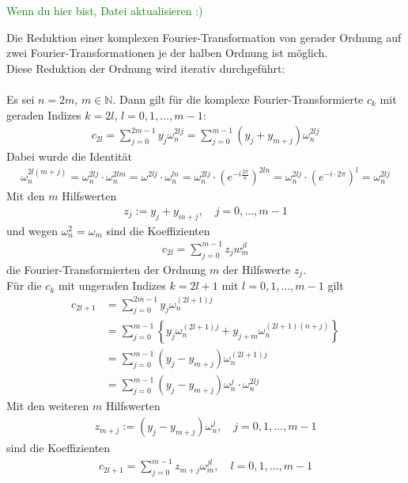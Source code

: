 \textcolor{green}{Wenn du hier bist, Datei aktualisieren :)}

Die Reduktion einer komplexen Fourier-Transformation von gerader Ordnung auf zwei Fourier-Transformationen je der halben
Ordnung ist möglich. \\
Diese Reduktion der Ordnung wird iterativ durchgeführt: \\ \\
Es sei $n=2m$, $m\in\mathbb{N}$. Dann gilt für die komplexe Fourier-Transformierte $c_k$ mit geraden Indizes 
$k=2l$, $l=0,1,\dots,m-1$:
\begin{align*}
  c_{2l} = \sum_{j=0}^{2m-1}y_j\omega_n^{2lj} = \sum_{j=0}^{m-1} (y_j+y_{m+j})\omega_n^{2lj}
\end{align*}
Dabei wurde die Identität 
\begin{align*}
  \omega_n^{2l(m+j)} 
  = \omega_n^{2lj}\cdot \omega_n^{2lm} 
  = \omega^{2lj}\cdot \omega_n^{ln} = \omega_n^{2lj}\cdot \left(e^{-i\tfrac{2\pi}{n}}\right)^{2ln} 
  = \omega_n^{2lj}\cdot \left(e^{-i\cdot2\pi}\right)^l 
  = \omega_n^{2lj}
\end{align*}
Mit den $m$ Hilfswerten 
\begin{align*}
  z_j := y_j + y_{m+j}, \quad j=0,\dots,m-1
\end{align*}
und wegen $\omega_n^2 = \omega_m$ sind die Koeffizienten 
\begin{align*}
  c_{2l} = \sum_{j=0}^{m-1} z_jw_m^{jl}
\end{align*}
die Fourier-Transformierten der Ordnung $m$ der Hilfswerte $z_j$. \\
Für die $c_k$ mit ungeraden Indizes $k=2l+1$ mit $l=0,1,\dots,m-1$ gilt 
\begin{align*}
  c_{2l+1} &= \sum_{j=0}^{2m-1} y_j\omega_n^{(2l+1)j} \\
  &= \sum_{j=0}^{m-1}\left\{ y_j\omega_n^{(2l+1)j}+y_{j+m}\omega_n^{(2l+1)(n+j)}\right\}\\
  &= \sum_{j=0}^{m-1}(y_j-y_{m+j})\omega_n^{(2l+1)j} \\
  &= \sum_{j=0}^{m-1}(y_j-y_{m+j})\omega_n^{j}\cdot\omega_n^{2lj}
\end{align*}
Mit den weiteren $m$ Hilfswerten
\begin{align*}
  z_{m+j} := (y_j-y_{m+j})\omega_n^j,\quad j=0,1,\dots,m-1
\end{align*}
sind die Koeffizienten
\begin{align*}
  c_{2l+1} = \sum_{j=0}^{m-1} z_{m+j} \omega_m^{jl}, \quad l=0,1,\dots,m-1
\end{align*}
